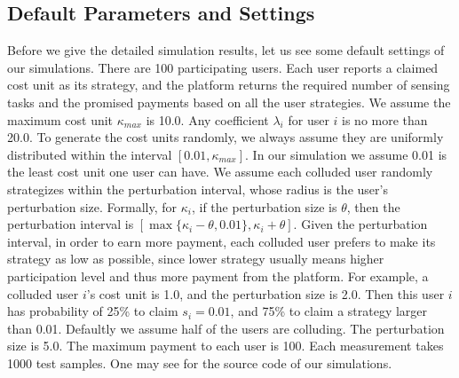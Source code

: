 \documentclass[conference]{IEEEtran}
\theoremstyle{definition}
\begin{document}
\subsection{Default Parameters and Settings}
Before we give the detailed simulation results, let us see some default settings of our simulations. There are 100 participating users. Each user reports a claimed cost unit as its strategy, and the platform returns the required number of sensing tasks and the promised payments based on all the user strategies. We assume the maximum cost unit $\kappa_{max}$ is 10.0. %
Any coefficient $\lambda_i$ for user $i$ is no more than 20.0. To generate the cost units randomly, we always assume they are uniformly distributed within the interval $[0.01,\kappa_{max}]$. In our simulation we assume 0.01 is the least cost unit one user can have. We assume each colluded user randomly strategizes within the perturbation interval, whose radius is the user's perturbation size. Formally, for $\kappa_i$, if the perturbation size is $\theta$, then the perturbation interval is $[\max\{\kappa_i-\theta,0.01\},\kappa_i+\theta]$. Given the perturbation interval, in order to earn more payment, each colluded user prefers to make its strategy as low as possible, since lower strategy usually means higher participation level and thus more payment from the platform. For example, a colluded user $i$'s cost unit is 1.0, and the perturbation size is 2.0. Then this user $i$ has probability of 25\% to claim $s_i=0.01$, and 75\% to claim a strategy larger than 0.01. Defaultly we assume half of the users are colluding. The perturbation size is 5.0. The maximum payment to each user is 100. Each measurement takes 1000 test samples. One may see \cite{mycodes} for the source code of our simulations.
\end{document}
